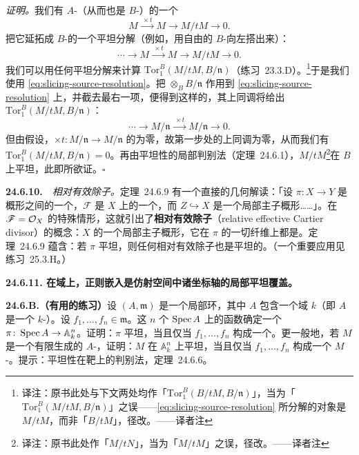 \emph{证明。}\quad 我们有 $A$-\trModule{}（从而也是 $B$-\trModule）的一个\trExactSequence
\[
M \xrightarrow{\ \times t\ } M \longrightarrow M/tM \longrightarrow 0.
\]
把它延拓成 $B$-\trModule{}的一个平坦分解（例如，用自由的 $B$-\trModule{}向左搭出来）：
\[
\tag{24.6.9.1}\label{eq:slicing-source-resolution}
\cdots \longrightarrow M \xrightarrow{\ \times t\ } M \longrightarrow M/tM \longrightarrow 0.
\]
我们可以用任何平坦分解来计算 $\mathrm{Tor}^B_1(M/tM,B/\mathfrak{n})$（\mbox{练习~23.3.D}）。\footnote{译注：原书此处与下文两处均作「$\mathrm{Tor}^B_1(B/tM,B/\mathfrak{n})$」，当为「$\mathrm{Tor}^B_1(M/tM,B/\mathfrak{n})$」之误——\eqref{eq:slicing-source-resolution} 所分解的对象是 $M/tM$，而非「$B/tM$」，径改。——译者注}于是我们使用 \eqref{eq:slicing-source-resolution}。把 $\otimes_B B/\mathfrak{n}$ 作用到 \eqref{eq:slicing-source-resolution} 上，并截去最右一项，便得到这样的\trComplexN，其上同调将给出 $\mathrm{Tor}^B_1(M/tM,B/\mathfrak{n})$：
\[
\cdots \longrightarrow M/\mathfrak{n} \xrightarrow{\ \times t\ } M/\mathfrak{n} \longrightarrow 0.
\]
但由假设，$\times t\colon M/\mathfrak{n}\to M/\mathfrak{n}$ 的\trKernel{}为零，故第一步处的上同调为零，从而我们有 $\mathrm{Tor}^B_1(M/tM,B/\mathfrak{n})=0$。再由平坦性的局部判别法（\mbox{定理~24.6.1}），$M/tM$\footnote{译注：原书此处作「$M/tN$」，当为「$M/tM$」之误，径改。——译者注}在 $B$ 上平坦，此即所欲证。\hfill$\square$

\textbf{24.6.10.}\ \extrahard\ \emph{相对有效\trCartier{}除子。}\quad \mbox{定理~24.6.9} 有一个直接的几何解读：「设 $\pi\colon X\to Y$ 是\trNoether{}概形之间的一个\trMorphism，$\mathscr{F}$ 是 $X$ 上的一个\trCoherentSheaf，而 $Z\hookrightarrow X$ 是一个局部主子概形……」。在 $\mathscr{F}=\mathcal{O}_X$ 的特殊情形，这就引出了\textbf{相对有效\trCartier{}除子}（relative effective Cartier divisor）的概念：$X$ 的一个局部主子概形，它在 $\pi$ 的一切纤维上都是\trEffectiveCartierDivisor。\mbox{定理~24.6.9} 蕴含：若 $\pi$ 平坦，则任何相对有效\trCartier{}除子也是平坦的。（一个重要应用见\mbox{练习~25.3.H}。）

\textbf{24.6.11. 在域上，正则嵌入是仿射空间中诸坐标轴的局部平坦覆盖。}

\textbf{24.6.B.（有用的练习）}\quad 设 $(A,\mathfrak{m})$ 是一个\trNoether{}局部环，其中 $A$ 包含一个域 $k$（即 $A$ 是一个 $k$-\trAlgebra）。设 $f_1,\dots,f_n\in\mathfrak{m}$。这 $n$ 个 $\operatorname{Spec} A$ 上的函数确定一个\trMorphism{} $\pi\colon\operatorname{Spec} A\to\mathbb{A}^n_k$。证明：$\pi$ 平坦，当且仅当 $f_1,\dots,f_n$ 构成一个\trRegularSequence。更一般地，若 $M$ 是一个有限生成的 $A$-\trModule，证明：$M$ 在 $\mathbb{A}^n_k$ 上平坦，当且仅当 $f_1,\dots,f_n$ 构成一个 $M$-\trRegularSequence。提示：平坦性在靶上的\trSlicing{}判别法，\mbox{定理~24.6.6}。

